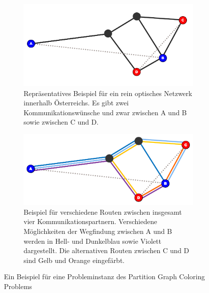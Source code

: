 \begin{figure}
	\centering
	\begin{subfigure}{\textwidth}
		\includegraphics{img/bsp1}
		\caption{Repräsentatives Beispiel für ein rein optisches Netzwerk innerhalb Österreichs. Es gibt zwei Kommunikationswünsche und zwar zwischen A und B sowie zwischen C und D.}
		\label{fig:example:a}
	\end{subfigure}
	\begin{subfigure}{\textwidth}
		\includegraphics{img/bsp2}
		\caption{Beispiel für verschiedene Routen zwischen insgesamt vier Kommunikationspartnern. Verschiedene Möglichkeiten der Wegfindung zwischen A und B werden in Hell- und Dunkelblau sowie Violett dargestellt. Die alternativen Routen zwischen C und D sind Gelb und Orange eingefärbt.}
		\label{fig:example:b}
	\end{subfigure}
	\caption{Ein Beispiel für eine Probleminstanz des Partition Graph Coloring Problems}
	\label{fix:example}
\end{figure}

